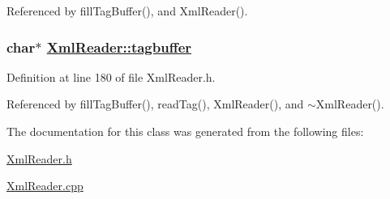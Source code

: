 Referenced by fill\-Tag\-Buffer(), and Xml\-Reader().\hypertarget{classXmlReader_p2}{
\subsubsection[tagbuffer]{\setlength{\rightskip}{0pt plus 5cm}char$\ast$ \hyperlink{classXmlReader_p2}{Xml\-Reader::tagbuffer}}}
\label{classXmlReader_p2}




Definition at line 180 of file Xml\-Reader.h.

Referenced by fill\-Tag\-Buffer(), read\-Tag(), Xml\-Reader(), and $\sim$Xml\-Reader().

The documentation for this class was generated from the following files:\begin{CompactItemize}
\item 
\hyperlink{XmlReader_8h}{Xml\-Reader.h}\item 
\hyperlink{XmlReader_8cpp}{Xml\-Reader.cpp}\end{CompactItemize}
